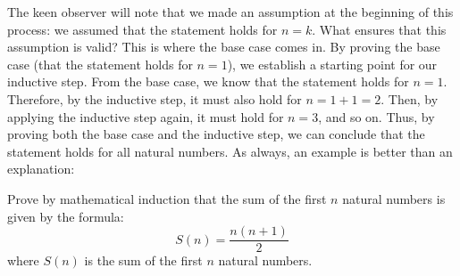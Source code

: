 The keen observer will note that we made an assumption at the beginning of this process: we assumed 
that the statement holds for $n=k$. What ensures that this assumption is valid? This is where the base case comes in.
By proving the base case (that the statement holds for $n=1$), we establish a starting point for our inductive step.
From the base case, we know that the statement holds for $n=1$. Therefore, by the inductive step, it must also hold for $n=1+1=2$.
Then, by applying the inductive step again, it must hold for $n=3$, and so on. Thus, by proving both the base case and the inductive step,
we can conclude that the statement holds for all natural numbers. As always, an example is better than an explanation:

\begin{exercise}
    Prove by mathematical induction that the sum of the first $n$ natural numbers is given by the formula:
    \begin{equation}\label{eq:inductive-proof-ex1}
        S(n) = \frac{n(n+1)}{2}
    \end{equation}
    where $S(n)$ is the sum of the first $n$ natural numbers.
\end{exercise}
